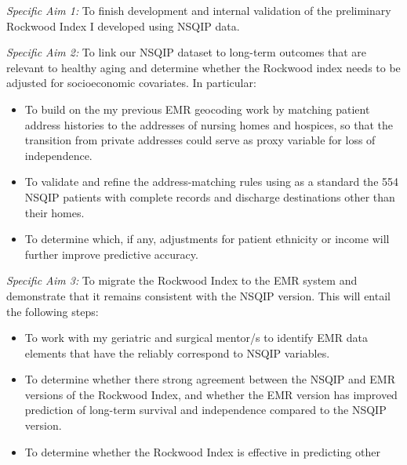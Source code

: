 \emph{Specific Aim 1:} To finish development and internal validation of the preliminary Rockwood Index I developed using NSQIP data.

\emph{Specific Aim 2:} To link our NSQIP dataset to long-term outcomes that are relevant to healthy aging and determine whether the Rockwood index needs to be adjusted for socioeconomic covariates. In particular:
\begin{itemize}
\item To build on the my previous EMR geocoding work by matching patient address histories to the addresses of nursing homes and hospices, so that the transition from private addresses could serve as  proxy variable for loss of independence.
\item To validate and refine the address-matching rules using as a standard the 554 NSQIP patients with complete records and discharge destinations other than their homes.
\item To determine which, if any, adjustments for patient ethnicity or income will further improve predictive accuracy.
\end{itemize}

\emph{Specific Aim 3:} To migrate the Rockwood Index to the EMR system and demonstrate that it remains consistent with the NSQIP version. This will entail the following steps:
\begin{itemize}
\item To work with my geriatric and surgical mentor/s to identify EMR data elements that have the reliably correspond to NSQIP variables.
\item To determine whether there strong agreement between the NSQIP and EMR versions of the Rockwood Index, and whether the EMR version has improved prediction of long-term survival and independence compared to the NSQIP version.
\item To determine whether the Rockwood Index is effective in predicting other  
\end{itemize}


